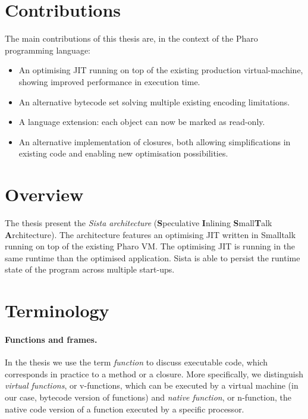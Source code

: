 \documentclass[a4paper,12pt,twoside]{../includes/ThesisStyle}
\begin{document}
\section{Contributions}

The main contributions of this thesis are, in the context of the Pharo programming language:
\begin{itemize}
	\item An optimising JIT running on top of the existing production virtual-machine, showing improved performance in execution time.
	\item An alternative bytecode set solving multiple existing encoding limitations.
	\item A language extension: each object can now be marked as read-only.
	\item An alternative implementation of closures, both allowing simplifications in existing code and enabling new optimisation possibilities.
\end{itemize}

\section{Overview}

The thesis present the \emph{Sista architecture} (\textbf{S}peculative \textbf{I}nlining \textbf{S}mall\textbf{T}alk \textbf{A}rchitecture). The architecture features an optimising JIT written in Smalltalk running on top of the existing Pharo VM. The optimising JIT is running in the same runtime than the optimised application. Sista is able to persist the runtime state of the program across multiple start-ups. %

\section{Terminology}

\paragraph{Functions and frames.} In the thesis we use the term \emph{function} to discuss executable code, which corresponds in practice to a method or a closure. More specifically, we distinguish \emph{virtual functions}, or v-functions, which can be executed by a virtual machine (in our case, bytecode version of functions) and \emph{native function}, or n-function, the native code version of a function executed by a specific processor. 
\end{document}
